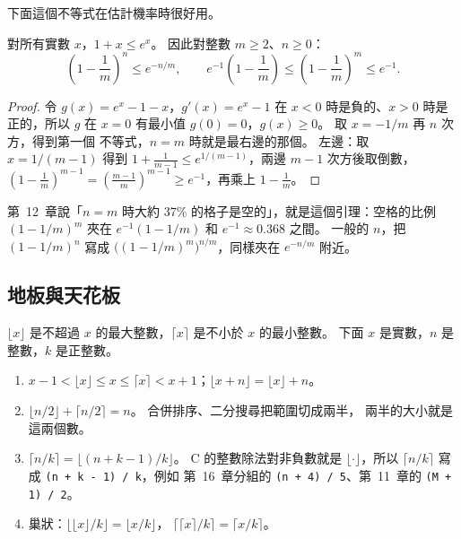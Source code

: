 下面這個不等式在估計機率時很好用。

\begin{lemma}
\label{lem:mth-exp}
對所有實數 $x$，$1 + x \le e^x$。 因此對整數 $m \ge 2$、$n \ge 0$：
\[
\left(1 - \frac{1}{m}\right)^{n} \le e^{-n/m},
\qquad
e^{-1}\left(1 - \frac{1}{m}\right) \le \left(1 - \frac{1}{m}\right)^{m} \le e^{-1}.
\]
\end{lemma}

\begin{proof}
令 $g(x) = e^x - 1 - x$，$g'(x) = e^x - 1$ 在 $x < 0$ 時是負的、$x > 0$ 時是正的，所以
$g$ 在 $x = 0$ 有最小值 $g(0) = 0$，$g(x) \ge 0$。 取 $x = -1/m$ 再 $n$ 次方，得到第一個
不等式，$n = m$ 時就是最右邊的那個。 左邊：取 $x = 1/(m - 1)$ 得到
$1 + \frac{1}{m-1} \le e^{1/(m-1)}$，兩邊 $m - 1$ 次方後取倒數，
$\left(1 - \frac{1}{m}\right)^{m-1} = \left(\frac{m-1}{m}\right)^{m-1} \ge e^{-1}$，再乘上
$1 - \frac{1}{m}$。
\end{proof}

第~12~章說「$n = m$ 時大約 $37\%$ 的格子是空的」，就是這個引理：空格的比例
$(1 - 1/m)^m$ 夾在 $e^{-1}(1 - 1/m)$ 和 $e^{-1} \approx 0.368$ 之間。 一般的 $n$，把
$(1 - 1/m)^n$ 寫成 $\bigl((1 - 1/m)^m\bigr)^{n/m}$，同樣夾在 $e^{-n/m}$ 附近。

\subsection{地板與天花板}

$\lfloor x \rfloor$ 是不超過 $x$ 的最大整數，$\lceil x \rceil$ 是不小於 $x$ 的最小整數。
下面 $x$ 是實數，$n$ 是整數，$k$ 是正整數。

\begin{enumerate}
\item $x - 1 < \lfloor x \rfloor \le x \le \lceil x \rceil < x + 1$；$\lfloor x + n \rfloor
= \lfloor x \rfloor + n$。
\item $\lfloor n/2 \rfloor + \lceil n/2 \rceil = n$。 合併排序、二分搜尋把範圍切成兩半，
兩半的大小就是這兩個數。 
\item $\lceil n/k \rceil = \lfloor (n + k - 1)/k \rfloor$。 C 的整數除法對非負數就是
$\lfloor \cdot \rfloor$，所以 $\lceil n/k \rceil$ 寫成 \texttt{(n + k - 1) / k}，例如
第~16~章分組的 \texttt{(n + 4) / 5}、第~11~章的 \texttt{(M + 1) / 2}。
\item 巢狀：$\bigl\lfloor \lfloor x \rfloor / k \bigr\rfloor = \lfloor x / k \rfloor$，
$\bigl\lceil \lceil x \rceil / k \bigr\rceil = \lceil x / k \rceil$。 
\end{enumerate}

